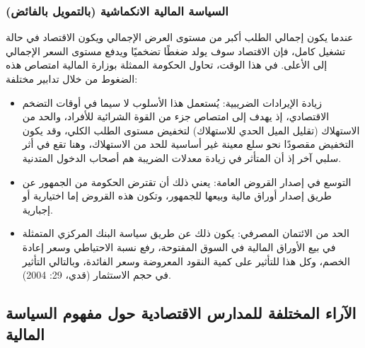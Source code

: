 \documentclass[10pt,a4paper]{report}
\begin{document}
\begin{doublespacing}
\subsubsection{السياسة المالية الانكماشية (بالتمويل بالفائض)}
عندما يكون إجمالي الطلب أكبر من مستوى العرض الإجمالي ويكون الاقتصاد في حالة تشغيل كامل، فإن الاقتصاد سوف يولد ضغطًا تضخميًا ويدفع مستوى السعر الإجمالي إلى الأعلى. في هذا الوقت، تحاول الحكومة الممثلة بوزارة المالية امتصاص هذه الضغوط من خلال تدابير مختلفة:
\begin{itemize}
	\item زيادة الإيرادات الضريبية: يُستعمل هذا الأسلوب لا سيما في أوقات التضخم الاقتصادي، إذ يهدف إلى امتصاص جزء من القوة الشرائية للأفراد، والحد من الاستهلاك (تقليل الميل الحدي للاستهلاك) لتخفيض مستوى الطلب الكلي، وقد يكون التخفيض مقصودًا نحو سلع معينة غير أساسية للحد من الاستهلاك، وهنا تقع في أثر سلبي آخر إذ أن المتأثر في زيادة معدلات الضريبة هم أصحاب الدخول المتدنية.
	\item التوسع في إصدار القروض العامة: يعني ذلك أن تقترض الحكومة من الجمهور عن طريق إصدار أوراق مالية وبيعها للجمهور، وتكون هذه القروض إما اختيارية أو إجبارية.
	\item الحد من الائتمان المصرفي: يكون ذلك عن طريق سياسة البنك المركزي المتمثلة في بيع الأوراق المالية في السوق المفتوحة، رفع نسبة الاحتياطي وسعر إعادة الخصم، وكل هذا للتأثير على كمية النقود المعروضة وسعر الفائدة، وبالتالي التأثير في حجم الاستثمار {(قدي، 29: 2004)}.
\end{itemize}
\subsection{الآراء المختلفة للمدارس الاقتصادية حول مفهوم السياسة المالية}

\end{doublespacing}
\end{document}
